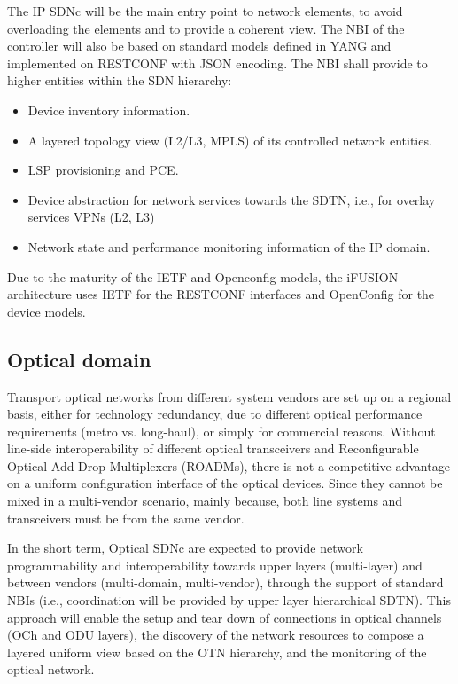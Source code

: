\documentclass[a4paper,fleqn]{cas-dc}
\begin{document}
The IP SDNc will be the main entry point to network elements, to avoid overloading the elements and to provide a coherent view. The NBI of the controller will also be based on standard models defined in YANG and implemented on RESTCONF with JSON encoding. The NBI shall provide to higher entities within the SDN hierarchy:
\begin{itemize}
\item Device inventory information.
\item A layered topology view (L2/L3, MPLS) of its controlled network entities.
\item LSP provisioning and PCE.
\item Device abstraction for network services towards the SDTN, i.e., for overlay services VPNs (L2, L3)
\item Network state and performance monitoring information of the IP domain. 
\end{itemize}

Due to the maturity of the IETF and Openconfig models, the i\uppercase{FUSION} architecture uses IETF for the RESTCONF interfaces and OpenConfig for the device models.

\subsection{Optical domain}
\label{section:dwdm}
Transport optical networks from different system vendors are set up on a regional basis, either for technology redundancy, due to different optical performance requirements (metro vs. long-haul), or simply for commercial reasons. 
Without line-side interoperability of different optical transceivers and Reconfigurable Optical Add-Drop Multiplexers (ROADMs), there is not a competitive advantage on a uniform configuration interface of the optical devices. Since they cannot be mixed in a multi-vendor scenario, mainly because, both line systems and transceivers must be from the same vendor.

In the short term, Optical SDNc are expected to provide network programmability and interoperability towards upper layers (multi-layer) and between vendors (multi-domain, multi-vendor), through the support of standard NBIs (i.e., coordination will be provided by upper layer hierarchical SDTN). This approach will enable the setup and tear down of connections in optical channels (OCh and ODU layers), the discovery of the network resources to compose a layered uniform view based on the OTN hierarchy, and the monitoring of the optical network.
\end{document}
